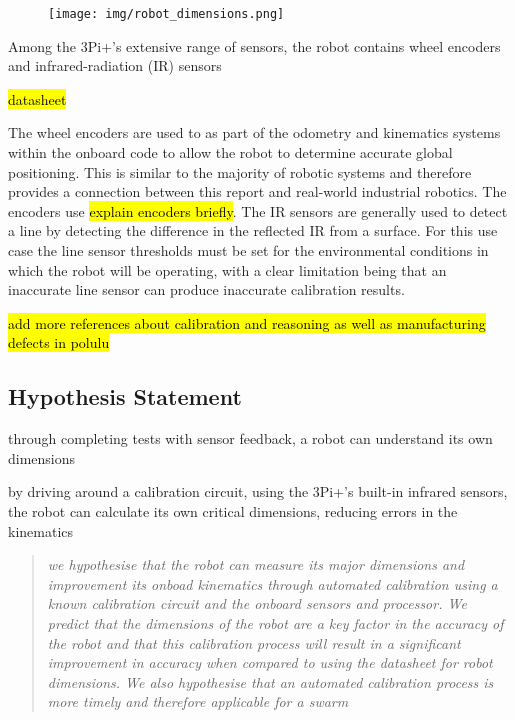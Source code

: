 \documentclass[conference]{IEEEtran}
\begin{document}
\begin{figure}[h!]
    \centering
    \texttt{[image: img/robot\_dimensions.png]}
    \caption{}
    \label{fig:}
\end{figure}

Among the 3Pi+'s extensive range of sensors, the robot contains wheel encoders and infrared-radiation (IR) sensors 

\hl{datasheet} 

The wheel encoders are used to as part of the odometry and kinematics systems within the onboard code to allow the robot to determine accurate global positioning. This is similar to the majority of robotic systems and therefore provides a connection between this report and real-world industrial robotics. The encoders use \hl{explain encoders briefly}. The IR sensors are generally used to detect a line by detecting the difference in the reflected IR from a surface. For this use case the line sensor thresholds must be set for the environmental conditions in which the robot will be operating, with a clear limitation being that an inaccurate line sensor can produce inaccurate calibration results. 




\hl{add more references about calibration and reasoning as well as manufacturing defects in polulu}


\subsection{Hypothesis Statement}

through completing tests with sensor feedback, a robot can understand its own dimensions

by driving around a calibration circuit, using the 3Pi+'s built-in infrared sensors, the robot can calculate its own critical dimensions, reducing errors in the kinematics


\begin{quote}
    \emph{
     we hypothesise that the robot can measure its major dimensions and improvement its onboad kinematics through automated calibration using a known calibration circuit and the onboard sensors and processor. 
     We predict that the dimensions of the robot are a key factor in the accuracy of the robot and that this calibration process will result in a significant improvement in accuracy when compared to using the datasheet for robot dimensions.
     We also hypothesise that an automated calibration process is more timely and therefore applicable for a swarm
    }
\end{quote}
\end{document}
